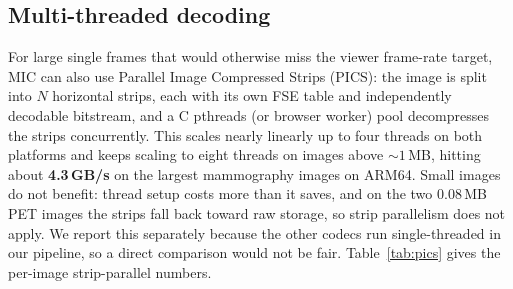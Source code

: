 \documentclass[journal]{IEEEtran}
\begin{document}
\subsection{Multi-threaded decoding}

For large single frames that would otherwise miss the viewer frame-rate target,
MIC can also use Parallel Image Compressed Strips (PICS): the image is split
into $N$ horizontal strips, each with its own FSE table and independently
decodable bitstream, and a C pthreads (or browser worker) pool decompresses the
strips concurrently. This scales nearly linearly up to four threads on both
platforms and keeps scaling to eight threads on images above ${\sim}1$\,MB,
hitting about \textbf{4.3\,GB/s} on the largest mammography images on ARM64.
Small images do not benefit: thread setup costs more than it saves, and on the
two 0.08\,MB PET images the strips fall back toward raw storage, so strip
parallelism does not apply. We report this separately because the other codecs
run single-threaded in our pipeline, so a direct comparison would not be fair.
Table~\ref{tab:pics} gives the per-image strip-parallel numbers.
\end{document}
